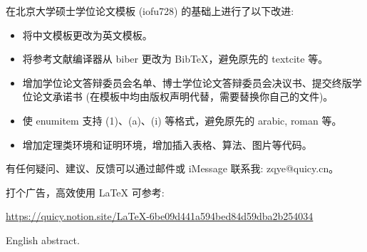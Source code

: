 \begin{cabstract}
    在北京大学硕士学位论文模板 (iofu728) 的基础上进行了以下改进:
    \begin{itemize}
        \item 将中文模板更改为英文模板。
        \item 将参考文献编译器从 biber 更改为 BibTeX，避免原先的 textcite 等。
        \item 增加学位论文答辩委员会名单、博士学位论文答辩委员会决议书、提交终版学位论文承诺书 (在模板中均由版权声明代替，需要替换你自己的文件)。
        \item 使 enumitem 支持 (1)、(a)、(i) 等格式，避免原先的 arabic, roman 等。
        \item 增加定理类环境和证明环境，增加插入表格、算法、图片等代码。
    \end{itemize}

    \bigskip

    有任何疑问、建议、反馈可以通过邮件或 iMessage 联系我: zqye@quicy.cn。
    
    \bigskip
    
    打个广告，高效使用 LaTeX 可参考:

    \url{https://quicy.notion.site/LaTeX-6be09d441a594bed84d59dba2b254034}


\end{cabstract}

\begin{eabstract}
English abstract.
\end{eabstract}